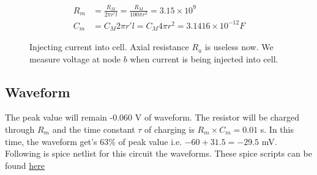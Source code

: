 \documentclass[]{article}
\begin{document}
\begin{align}
    R_m &= \frac{R_M}{2 \pi r' l} = \frac{R_M}{100 \pi r^2 }  = 3.15 \times
    10^{9} \\
    C_m &= C_M 2\pi r' l = C_M 4\pi r^2 =  3.1416 \times 10^{-12} F
\end{align}

\begin{figure}[h]
    \usetikzlibrary{shapes,shadows,circuits.ee.IEC}
    \centering

    \caption{Injecting current into cell. Axial resistance $R_a$ is useless now.
    We measure voltage at node $b$ when current is being injected into cell.}
    \label{fig:sphere}
\end{figure}

\subsection{Waveform}\label{waveform}

The peak value will remain -0.060 V of waveform. The resistor will be
charged through $R_m$ and the time constant $\tau$ of charging is
$R_m \times C_m = 0.01$ s. In this time, the waveform get's $63 \%$ of
peak value i.e. $- 60 + 31.5 = - 29.5$ mV. Following is spice netlist
for this circuit the waveforms. These spice scripts can be found
\href{http://github.com/dilawar/courses/raw/master/NeuroCourse/Assignments/Second/}{here}
\end{document}
